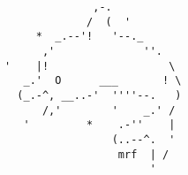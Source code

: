 \documentclass{article}
\begin{document}
\vfill
\centering
\begin{BVerbatim}
              ,-.
             /  (  '
     *  _.--'!   '--._
      ,'              ''.
'    |!                   \
   _.'  O      ___       ! \
  (_.-^, __..-'  ''''--.   )
      /,'        '    _.' /
   '         *    .-''    |
                 (..--^.  ' 
                  mrf  | /
                       '
\end{BVerbatim}
\end{document}
